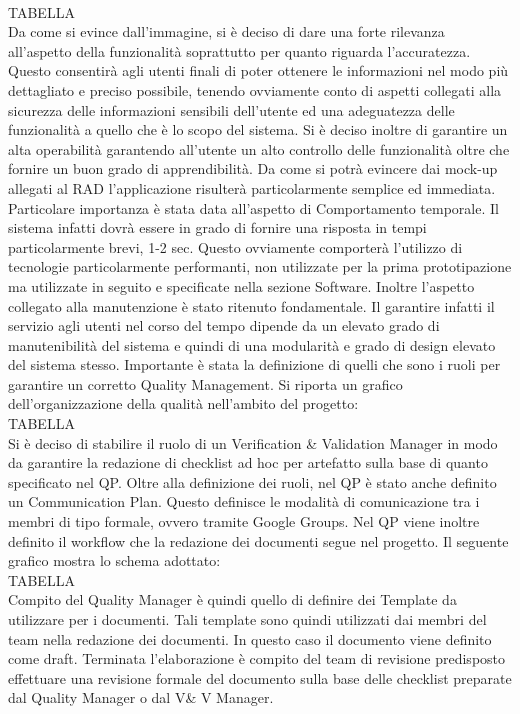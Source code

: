 \\
TABELLA
\\
Da come si evince dall’immagine, si è deciso di dare una forte rilevanza all’aspetto della funzionalità soprattutto per quanto riguarda l’accuratezza.
Questo consentirà agli utenti finali di poter ottenere le informazioni nel modo più dettagliato e preciso possibile, tenendo ovviamente conto di aspetti collegati alla sicurezza delle informazioni sensibili dell’utente ed una adeguatezza delle funzionalità a quello che è lo scopo del sistema.
Si è deciso inoltre di garantire un alta operabilità garantendo all’utente un alto controllo delle funzionalità oltre che fornire un buon grado di apprendibilità.
Da come si potrà evincere dai mock-up allegati al RAD l’applicazione risulterà particolarmente semplice ed immediata.
Particolare importanza è stata data all’aspetto di Comportamento temporale. Il sistema infatti dovrà essere in grado di fornire una risposta in tempi particolarmente brevi, 1-2 sec.
Questo ovviamente comporterà l’utilizzo di tecnologie particolarmente performanti, non utilizzate per la prima prototipazione ma utilizzate in seguito e specificate nella sezione Software.
Inoltre l’aspetto collegato alla manutenzione è stato ritenuto fondamentale. Il garantire infatti il servizio agli utenti nel corso del tempo dipende da un elevato grado di manutenibilità del sistema e quindi di una modularità e grado di design elevato del sistema stesso.
Importante è stata la definizione di quelli che sono i ruoli per garantire un corretto Quality Management.
Si riporta un grafico dell’organizzazione della qualità nell’ambito del progetto:
\\
TABELLA
\\
Si è deciso di stabilire il ruolo di un Verification \& Validation Manager in modo da garantire la redazione di checklist ad hoc per artefatto sulla base di quanto specificato nel QP.
Oltre alla definizione dei ruoli, nel QP è stato anche definito un Communication Plan. Questo definisce le modalità di comunicazione tra i membri di tipo formale, ovvero tramite Google Groups.
Nel QP viene inoltre definito il workflow che la redazione dei documenti segue nel progetto. Il seguente grafico mostra lo schema adottato:
\\
TABELLA
\\
Compito del Quality Manager è quindi quello di definire dei Template da utilizzare per i documenti. Tali template sono quindi utilizzati dai membri del team nella redazione dei documenti.
In questo caso il documento viene definito come draft. Terminata l’elaborazione è compito del team di revisione predisposto effettuare una revisione formale del documento sulla base delle checklist preparate dal Quality Manager o dal V\& V Manager. 
